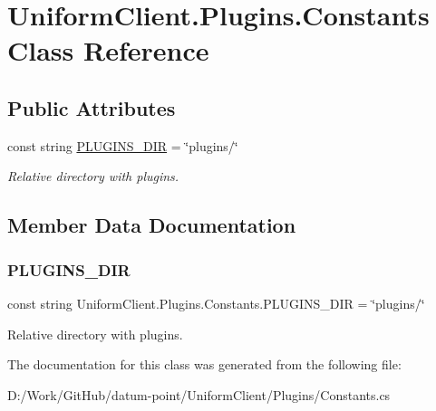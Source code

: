 \hypertarget{class_uniform_client_1_1_plugins_1_1_constants}{}\section{Uniform\+Client.\+Plugins.\+Constants Class Reference}
\label{class_uniform_client_1_1_plugins_1_1_constants}
\subsection*{Public Attributes}
\begin{DoxyCompactItemize}
\item 
const string \mbox{\hyperlink{class_uniform_client_1_1_plugins_1_1_constants_a7005abdb0c3ee5ba9e841769a7ecd575}{P\+L\+U\+G\+I\+N\+S\+\_\+\+D\+IR}} = \char`\"{}plugins/\char`\"{}
\begin{DoxyCompactList}\small\item\em Relative directory with plugins. \end{DoxyCompactList}\end{DoxyCompactItemize}


\subsection{Member Data Documentation}
\mbox{\label{class_uniform_client_1_1_plugins_1_1_constants_a7005abdb0c3ee5ba9e841769a7ecd575}} 
\subsubsection{\texorpdfstring{P\+L\+U\+G\+I\+N\+S\+\_\+\+D\+IR}{PLUGINS\_DIR}}
{\footnotesize\ttfamily const string Uniform\+Client.\+Plugins.\+Constants.\+P\+L\+U\+G\+I\+N\+S\+\_\+\+D\+IR = \char`\"{}plugins/\char`\"{}}



Relative directory with plugins. 



The documentation for this class was generated from the following file\+:\begin{DoxyCompactItemize}
\item 
D\+:/\+Work/\+Git\+Hub/datum-\/point/\+Uniform\+Client/\+Plugins/Constants.\+cs\end{DoxyCompactItemize}
